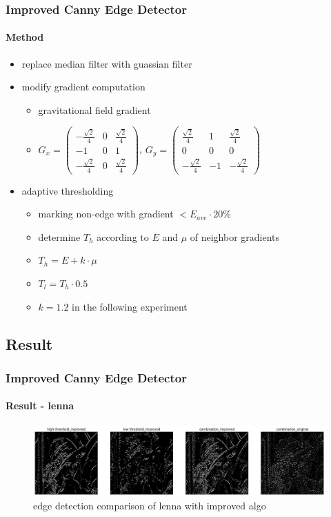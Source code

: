 \documentclass[
	11pt, %
	aspectratio=169, %
]{beamer}
\begin{document}
\begin{frame}
	\frametitle{Improved Canny Edge Detector}
	\framesubtitle{Method}

	\begin{itemize}
		\item replace median filter with guassian filter \cite{xuan2017improved}
		\item modify gradient computation
		\begin{itemize}
			\item gravitational field gradient \cite{rong2014improved}
			\item $G_x = \begin{pmatrix}
							-\frac{\sqrt{2}}{4} & 0 & \frac{\sqrt{2}}{4} \\
							-1 & 0 & 1 \\
							-\frac{\sqrt{2}}{4} & 0 & \frac{\sqrt{2}}{4}
						\end{pmatrix}$, 
				  $G_y = \begin{pmatrix}
							\frac{\sqrt{2}}{4} & 1 & \frac{\sqrt{2}}{4} \\
							0 & 0 & 0 \\
							-\frac{\sqrt{2}}{4} & -1 & -\frac{\sqrt{2}}{4}
						\end{pmatrix}$
		\end{itemize}
		\item adaptive thresholding \cite{rong2014improved}
		\begin{itemize}
			\item marking non-edge with gradient $< E_{ave} \cdot 20\%$
			\item determine $T_h$ according to $E$ and $\mu$ of neighbor gradients
			\item $T_h = E + k \cdot \mu$
			\item $T_l = T_h \cdot 0.5$
			\item $k = 1.2$ in the following experiment
		\end{itemize}
	\end{itemize}
\end{frame}

\subsection{Result}

\begin{frame}
	\frametitle{Improved Canny Edge Detector}
	\framesubtitle{Result - lenna}

	\begin{figure}
		\includegraphics[width=0.9\linewidth]{lenna_threshold_compare_im.png}
		\caption{edge detection comparison of lenna with improved algo}
	\end{figure}

\end{frame}
\end{document}
